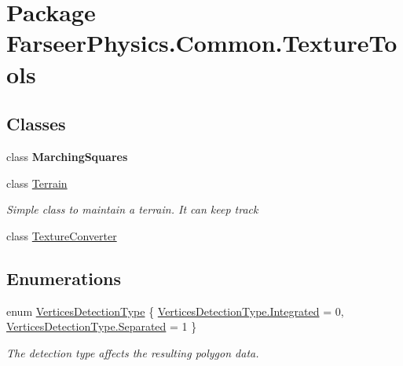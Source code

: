 \hypertarget{namespace_farseer_physics_1_1_common_1_1_texture_tools}{\section{Package Farseer\+Physics.\+Common.\+Texture\+Tools}
\label{namespace_farseer_physics_1_1_common_1_1_texture_tools}
}
\subsection*{Classes}
\begin{DoxyCompactItemize}
\item 
class {\bfseries Marching\+Squares}
\item 
class \hyperlink{class_farseer_physics_1_1_common_1_1_texture_tools_1_1_terrain}{Terrain}
\begin{DoxyCompactList}\small\item\em Simple class to maintain a terrain. It can keep track \end{DoxyCompactList}\item 
class \hyperlink{class_farseer_physics_1_1_common_1_1_texture_tools_1_1_texture_converter}{Texture\+Converter}
\end{DoxyCompactItemize}
\subsection*{Enumerations}
\begin{DoxyCompactItemize}
\item 
enum \hyperlink{namespace_farseer_physics_1_1_common_1_1_texture_tools_a8c78f960d4da62793329adae2e15d451}{Vertices\+Detection\+Type} \{ \hyperlink{namespace_farseer_physics_1_1_common_1_1_texture_tools_a8c78f960d4da62793329adae2e15d451a92d909e2ae45ed6c55a55088f1d46394}{Vertices\+Detection\+Type.\+Integrated} = 0, 
\hyperlink{namespace_farseer_physics_1_1_common_1_1_texture_tools_a8c78f960d4da62793329adae2e15d451a606970f24025625f40867ff6d152fa1e}{Vertices\+Detection\+Type.\+Separated} = 1
 \}
\begin{DoxyCompactList}\small\item\em The detection type affects the resulting polygon data. \end{DoxyCompactList}\end{DoxyCompactItemize}


